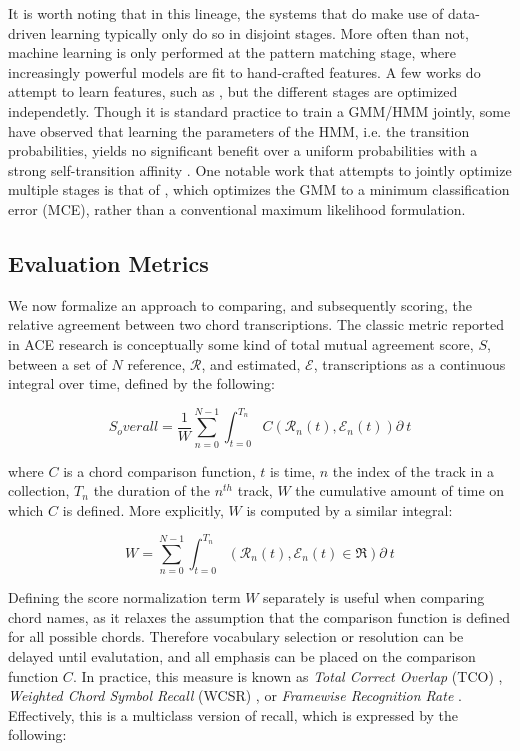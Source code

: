 It is worth noting that in this lineage, the systems that do make use of data-driven learning typically only do so in disjoint stages.
More often than not, machine learning is only performed at the pattern matching stage, where increasingly powerful models are fit to hand-crafted features.
A few works do attempt to learn features, such as \cite{MauchNNLS, Humphrey2012?}, but the different stages are optimized independetly.
Though it is standard practice to train a GMM/HMM jointly, some have observed that learning the parameters of the HMM, i.e. the transition probabilities, yields no significant benefit over a uniform probabilities with a strong self-transition affinity \cite{Cho2014PhD}.
One notable work that attempts to jointly optimize multiple stages is that of \cite{Kim2012}, which optimizes the GMM to a minimum classification error (MCE), rather than a conventional maximum likelihood formulation.


\subsection{Evaluation Metrics}
\label{subsec:evaluation_metrics}

We now formalize an approach to comparing, and subsequently scoring, the relative agreement between two chord transcriptions.
The classic metric reported in ACE research is conceptually some kind of total mutual agreement score, $S$, between a set of $N$ reference, $\mathcal{R}$, and estimated, $\mathcal{E}$, transcriptions as a continuous integral over time, defined by the following:

\begin{equation}
S_overall = \frac{1}{W}\sum_{n=0}^{N-1}\int_{t=0}^{T_n}C(\mathcal{R}_n(t), \mathcal{E}_n(t))\partial~t
\end{equation}

\noindent where $C$ is a chord comparison function, $t$ is time, $n$ the index of the track in a collection, $T_n$ the duration of the $n^{th}$ track, $W$ the cumulative amount of time on which $C$ is defined.
More explicitly, $W$ is computed by a similar integral:

\begin{equation}
W = \sum_{n=0}^{N-1}\int_{t=0}^{T_n}(\mathcal{R}_n(t), \mathcal{E}_n(t) \in \Re)\partial~t
\end{equation}

Defining the score normalization term $W$ separately is useful when comparing chord names, as it relaxes the assumption that the comparison function is defined for all possible chords.
Therefore vocabulary selection or resolution can be delayed until evalutation, and all emphasis can be placed on the comparison function $C$.
In practice, this measure is known as \emph{Total Correct Overlap} (TCO) \cite{Mauch, Harte, McVicar}, \emph{Weighted Chord Symbol Recall} (WCSR) \cite{MIReX}, or \emph{Framewise Recognition Rate} \cite{Cho2014}.
Effectively, this is a multiclass version of recall, which is expressed by the following:

